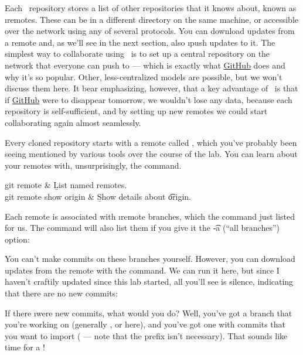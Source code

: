 \documentclass[letterpaper, 12pt, titlepage, twoside]{article}
\begin{document}
Each \git\ repository stores a list of other repositories that it knows about,
known as \i{remotes}. These can be in a different directory on the same
machine, or accessible over the network using any of several protocols. You
can download updates from a remote and, as we'll see in the next section, also
\i{push} updates to it. The simplest way to collaborate using \git\ is to set
up a central repository on the network that everyone can push to --- which is
exactly what \href{https://github.com/}{GitHub} does and why it's so popular.
Other, less-centralized models are possible, but we won't discuss them here.
It bear emphasizing, however, that a key advantage of \git\ is that if
\href{https://github.com/}{GitHub} were to disappear tomorrow, we wouldn't
lose any data, because each repository is self-sufficient, and by setting up
new remotes we could start collaborating again almost seamlessly.

Every cloned repository starts with a remote called , which you've
probably been seeing mentioned by various tools over the course of the lab.
You can learn about your remotes with, unsurprisingly, the 
command.

\begin{typeme}
git remote & \b{List named remotes.} \\
git remote show origin & \b{Show details about \t{origin}.}
\end{typeme}

Each remote is associated with \i{remote branches}, which the  command just listed for us. The  command will also list
them if you give it the \t{-a} (``all branches'') option:


You can't make commits on these branches yourself. However, you can download
updates from the remote with the  command. We can run it here, but
since I haven't craftily updated  since this lab started, all you'll
see is silence, indicating that there are no new commits:


If there \i{were} new commits, what would you do? Well, you've got a branch
that you're working on (generally , or  here), and
you've got one with commits that you want to import ( ---
note that the  prefix isn't necessary). That sounds like time for
a !
\end{document}
